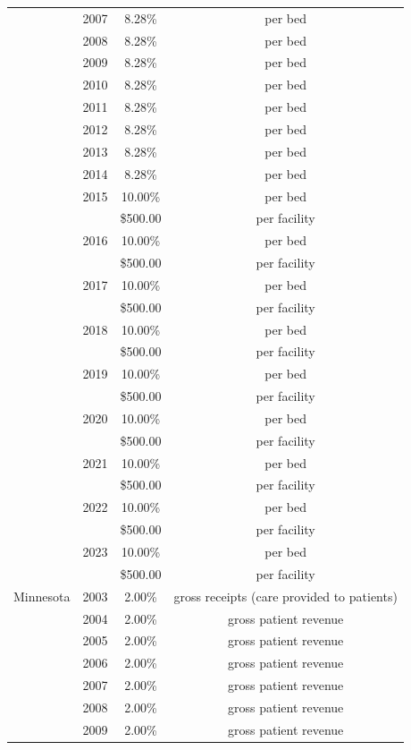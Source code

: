 \begin{longtable}{llcc}
 & 2007 & 8.28\% & per bed \\[0pt]
 & 2008 & 8.28\% & per bed \\[0pt]
 & 2009 & 8.28\% & per bed \\[0pt]
 & 2010 & 8.28\% & per bed \\[0pt]
 & 2011 & 8.28\% & per bed \\[0pt]
 & 2012 & 8.28\% & per bed \\[0pt]
 & 2013 & 8.28\% & per bed \\[0pt]
 & 2014 & 8.28\% & per bed \\[0pt]
 & 2015 & 10.00\% & per bed \\[0pt]
 &  & \$500.00 & per facility \\[0pt]
 & 2016 & 10.00\% & per bed \\[0pt]
 &  & \$500.00 & per facility \\[0pt]
 & 2017 & 10.00\% & per bed \\[0pt]
 &  & \$500.00 & per facility \\[0pt]
 & 2018 & 10.00\% & per bed \\[0pt]
 &  & \$500.00 & per facility \\[0pt]
 & 2019 & 10.00\% & per bed \\[0pt]
 &  & \$500.00 & per facility \\[0pt]
 & 2020 & 10.00\% & per bed \\[0pt]
 &  & \$500.00 & per facility \\[0pt]
 & 2021 & 10.00\% & per bed \\[0pt]
 &  & \$500.00 & per facility \\[0pt]
 & 2022 & 10.00\% & per bed \\[0pt]
 &  & \$500.00 & per facility \\[0pt]
 & 2023 & 10.00\% & per bed \\[0pt]
 &  & \$500.00 & per facility \\[0pt]
\midrule
Minnesota & 2003 & 2.00\% & gross receipts (care provided to patients) \\[0pt]
 & 2004 & 2.00\% & gross patient revenue \\[0pt]
 & 2005 & 2.00\% & gross patient revenue \\[0pt]
 & 2006 & 2.00\% & gross patient revenue \\[0pt]
 & 2007 & 2.00\% & gross patient revenue \\[0pt]
 & 2008 & 2.00\% & gross patient revenue \\[0pt]
 & 2009 & 2.00\% & gross patient revenue \\[0pt]

\end{longtable}
